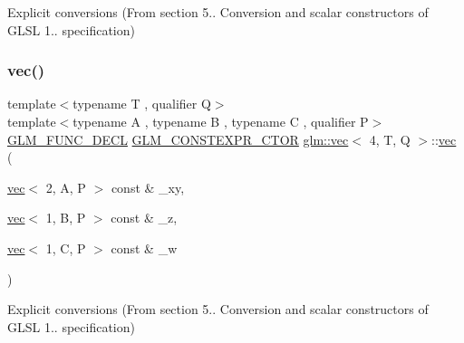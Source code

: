 Explicit conversions (From section 5.. Conversion and scalar constructors of G\+L\+SL 1.. specification) 

\mbox{\label{structglm_1_1vec_3_014_00_01_t_00_01_q_01_4_ae72bf7baa584d35cfadd6d3be750518b}} 
\subsubsection{\texorpdfstring{vec()}{vec()}\hspace{0.1cm}{\footnotesize\ttfamily [9/34]}}
{\footnotesize\ttfamily template$<$typename T , qualifier Q$>$ \\
template$<$typename A , typename B , typename C , qualifier P$>$ \\
\mbox{\hyperlink{setup_8hpp_ab2d052de21a70539923e9bcbf6e83a51}{G\+L\+M\+\_\+\+F\+U\+N\+C\+\_\+\+D\+E\+CL}} \mbox{\hyperlink{setup_8hpp_ad34178a09666081abdb573c14d1f4a5a}{G\+L\+M\+\_\+\+C\+O\+N\+S\+T\+E\+X\+P\+R\+\_\+\+C\+T\+OR}} \mbox{\hyperlink{structglm_1_1vec}{glm\+::vec}}$<$ 4, T, Q $>$\+::\mbox{\hyperlink{structglm_1_1vec}{vec}} (\begin{DoxyParamCaption}\item[{\mbox{\hyperlink{structglm_1_1vec}{vec}}$<$ 2, A, P $>$ const \&}]{\+\_\+xy,  }\item[{\mbox{\hyperlink{structglm_1_1vec}{vec}}$<$ 1, B, P $>$ const \&}]{\+\_\+z,  }\item[{\mbox{\hyperlink{structglm_1_1vec}{vec}}$<$ 1, C, P $>$ const \&}]{\+\_\+w }\end{DoxyParamCaption})}



Explicit conversions (From section 5.. Conversion and scalar constructors of G\+L\+SL 1.. specification) 

\mbox{\label{structglm_1_1vec_3_014_00_01_t_00_01_q_01_4_a888477e1cf2c8bf5418e99450ea850c1}} 
